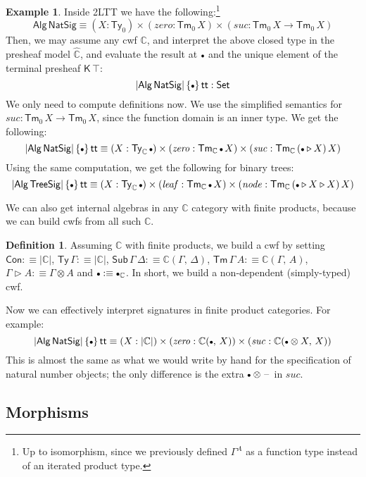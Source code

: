 \documentclass[12pt,a4paper,twoside,openany]{book}
\theoremstyle{remark}
\theoremstyle{definition}
\newtheorem{mydefinition}{Definition}
\newtheorem{myexample}{Example}
\theoremstyle{theorem}
\newcommand{\mi}[1]{\mathit{#1}}
\newcommand{\ms}[1]{\mathsf{#1}}
\newcommand{\mbb}[1]{\mathbb{#1}}
\newcommand{\Con}{\mathsf{Con}}
\newcommand{\Sub}{\mathsf{Sub}}
\newcommand{\Tm}{\mathsf{Tm}}
\newcommand{\Ty}{\mathsf{Ty}}
\renewcommand{\tt}{\mathsf{tt}}
\newcommand{\blank}{\mathord{\hspace{1pt}\text{--}\hspace{1pt}}}
\newcommand{\Set}{\mathsf{Set}}
\newcommand{\ext}{\triangleright}
\newcommand{\emptycon}{\scaleobj{.75}\bullet}
\newcommand{\K}{\mathsf{K}}
\newcommand{\Alg}{\ms{Alg}}
\newcommand{\mbbC}{\mbb{C}}
\newcommand{\hmbbC}{\hat{\mbb{C}}}
\newcommand{\defn}{:\equiv}
\begin{document}
\begin{myexample}
Inside 2LTT we have the following:\footnote{Up to isomorphism, since we previously defined $\Gamma^A$ as a function type instead of an iterated product type.}
\[ \Alg\,\ms{NatSig} \equiv (X : \Ty_0)\times(\mi{zero} : \Tm_0\,X)\times(\mi{suc} : \Tm_0\,X \to \Tm_0\,X) \]
Then, we may assume any cwf $\mbbC$, and interpret the above closed type in the
presheaf model $\hmbbC$, and evaluate the result at $\emptycon$ and
the unique element of the terminal presheaf $\K\,\top$:
\[
  |\Alg\,\ms{NatSig}|\,\{\emptycon\}\,\tt : \Set
\]
We only need to compute definitions now. We use the simplified semantics for
$\mi{suc} : \Tm_0\,X \to \Tm_0\,X$, since the function domain is an inner
type. We get the following:
\[
|\Alg\,\ms{NatSig}|\,\{\emptycon\}\,\tt \equiv
(X : \Ty_{\mbbC}\,\emptycon) \times (\mi{zero} : \Tm_{\mbbC}\,\emptycon\,X) \times (\mi{suc} : \Tm_{\mbbC}\,(\emptycon \ext X)\,X)
\]
Using the same computation, we get the following for binary trees:
\[
|\Alg\,\ms{TreeSig}|\,\{\emptycon\}\,\tt \equiv
(X : \Ty_{\mbbC}\,\emptycon) \times (\mi{leaf} : \Tm_{\mbbC}\,\emptycon\,X) \times (\mi{node} : \Tm_{\mbbC}\,(\emptycon \ext X \ext X)\,X)
\]
\end{myexample}

We can also get internal algebras in any $\mbbC$ category with finite products,
because we can build cwfs from all such $\mbbC$.

\begin{mydefinition} Assuming $\mbbC$ with finite products, we build a cwf by setting
$\Con \defn |\mbbC|$, $\Ty\,\Gamma \defn |\mbbC|$, $\Sub\,\Gamma\,\Delta \defn \mbbC(\Gamma,\,\Delta)$, $\Tm\,\Gamma\,A \defn \mbbC(\Gamma,\,A)$, $\Gamma \ext A \defn \Gamma \otimes A$ and $\emptycon \defn \emptycon_{\mbbC}$. In short, we build a non-dependent (simply-typed) cwf.
\end{mydefinition}

Now we can effectively interpret signatures in finite product categories. For
example:
\[
|\Alg\,\ms{NatSig}|\,\{\emptycon\}\,\tt \equiv
(X : |\mbbC|) \times (\mi{zero} : \mbbC(\emptycon,\,X)) \times (\mi{suc} : \mbbC(\emptycon \otimes X,\,X))
\]
This is almost the same as what we would write by hand for the specification of
natural number objects; the only difference is the extra $\emptycon
\otimes\blank$ in $\mi{suc}$.

\subsection{Morphisms}
\end{document}
